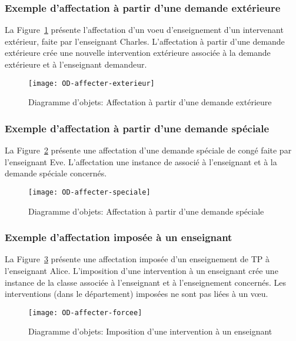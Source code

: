 \begin{ocl}
\subsubsection{Exemple d'affectation à partir d'une demande extérieure}
La Figure~\ref{fig:affectation:ext} présente l'affectation d'un voeu d'enseignement d'un intervenant extérieur, faite par l'enseignant Charles.
L'affectation à partir d'une demande extérieure crée une nouvelle intervention extérieure associée à la demande extérieure et à l'enseignant demandeur.

\begin{figure}[!htbp]
\begin{center}
\texttt{[image: OD-affecter-exterieur]}
\caption{Diagramme d'objets: Affectation à partir d'une demande extérieure}
\label{fig:affectation:ext}
\end{center}
\end{figure}


\subsubsection{Exemple d'affectation à partir d'une demande spéciale}
La Figure~\ref{fig:affectation:spe} présente une affectation d'une demande spéciale de congé faite par l'enseignant Eve.
L'affectation une instance de   associé à l'enseignant et à la demande spéciale concernés.

 \begin{figure}[!htbp]
 \begin{center}
 \texttt{[image: OD-affecter-speciale]}
 \caption{Diagramme d'objets: Affectation à partir d'une demande spéciale}
 \label{fig:affectation:spe}
 \end{center}
 \end{figure}

\subsubsection{Exemple d'affectation imposée à un enseignant}
La Figure~\ref{fig:affectation:imposee} présente une affectation imposée d'un enseignement de TP à l'enseignant Alice.
L'imposition d'une intervention à un enseignant crée une instance de la classe  associée à l'enseignant et à l'enseignement concernés. Les interventions (dans le département) imposées ne sont pas liées à un vœu.

\begin{figure}[!htbp]
\begin{center}
\texttt{[image: OD-affecter-forcee]}
\caption{Diagramme d'objets: Imposition d'une intervention à un enseignant}
\label{fig:affectation:imposee}
\end{center}
\end{figure}



\end{ocl}
